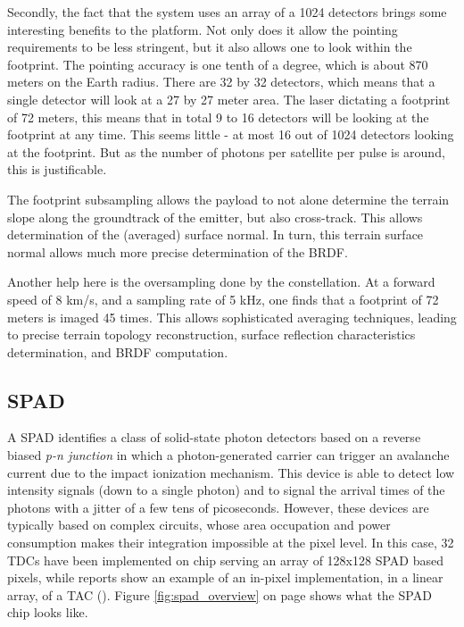 Secondly, the fact that the system uses an array of a 1024 detectors brings some interesting benefits to the platform. Not only does it allow the pointing requirements to be less stringent, but it also allows one to look within the footprint. The pointing accuracy is one tenth of a degree, which is about 870 meters on the Earth radius. There are 32 by 32 detectors, which means that a single detector will look at a 27 by 27 meter area. The laser dictating a footprint of 72 meters, this means that in total 9 to 16 detectors will be looking at the footprint at any time. This seems little - at most 16 out of 1024 detectors looking at the footprint. But as the number of photons per satellite per pulse is around, this is justificable.

The footprint subsampling allows the payload to not alone determine the terrain slope along the groundtrack of the emitter, but also cross-track. This allows determination of the (averaged) surface normal. In turn, this terrain surface normal allows much more precise determination of the \ac{BRDF}.

Another help here is the oversampling done by the constellation. At a forward speed of 8 km/s, and a sampling rate of 5 kHz, one finds that a footprint of 72 meters is imaged 45 times. This allows sophisticated averaging techniques, leading to precise terrain topology reconstruction, surface reflection characteristics determination, and \ac{BRDF} computation.

\subsection{\ac{SPAD}}
\label{SPAD}
A \acl{SPAD} identifies a class of solid-state photon detectors based on a reverse biased \textit{p-n junction} in which a photon-generated carrier can trigger an avalanche current due to the impact ionization mechanism. This device is able to detect low intensity signals (down to a single photon) and to signal the arrival times of the photons with a jitter of a few tens of picoseconds. However, these devices are typically based on complex circuits, whose area occupation and power consumption makes their integration impossible at the pixel level. In this case, 32 \acp{TDC} have been implemented on chip serving an array of 128x128 SPAD based pixels, while reports show an example of an in-pixel implementation, in a linear array, of a \ac{TAC} (\cite{SPAD3}). Figure \ref{fig:spad_overview} on page \pageref{fig:spad_overview} shows what the \acs{SPAD} chip looks like.

